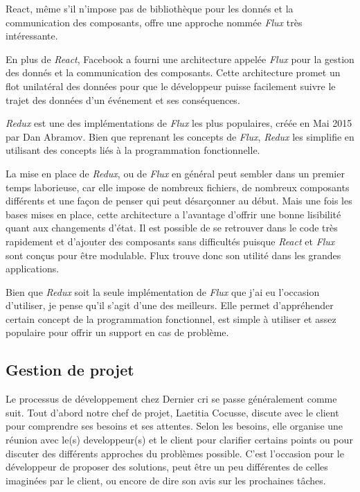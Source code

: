 React, même s'il n'impose pas de bibliothèque pour les donnés et la
communication des composants, offre une approche nommée \emph{Flux} très
intéressante.

\bigskip

En plus de \emph{React}, Facebook a fourni une architecture appelée
\emph{Flux} pour la gestion des donnés et la communication des
composants. Cette architecture promet un flot unilatéral des données
pour que le développeur puisse facilement suivre le trajet des données
d'un événement et ses conséquences.

\bigskip

\emph{Redux} est une des implémentations de \emph{Flux} les plus
populaires, créée en Mai 2015 par Dan Abramov. Bien que reprenant les
concepts de \emph{Flux}, \emph{Redux} les simplifie en utilisant des
concepts liés à la programmation fonctionnelle.

\bigskip

La mise en place de \emph{Redux}, ou de \emph{Flux} en général peut
sembler dans un premier temps laborieuse, car elle impose de nombreux
fichiers, de nombreux composants différents et une façon de penser qui
peut désarçonner au début. Mais une fois les bases mises en place, cette
architecture a l'avantage d'offrir une bonne lisibilité quant aux
changements d'état. Il est possible de se retrouver dans le code très
rapidement et d'ajouter des composants sans difficultés puisque
\emph{React} et \emph{Flux} sont conçus pour être modulable. Flux trouve
donc son utilité dans les grandes applications.

\bigskip

Bien que \emph{Redux} soit la seule implémentation de \emph{Flux} que
j'ai eu l'occasion d'utiliser, je pense qu'il s'agit d'une des
meilleurs. Elle permet d'appréhender certain concept de la programmation
fonctionnel, est simple à utiliser et assez populaire pour offrir un
support en cas de problème.

\bigskip

\subsection{Gestion de projet}\label{gestion-de-projet}

\bigskip

Le processus de développement chez Dernier cri se passe généralement
comme suit. Tout d'abord notre chef de projet, Laetitia Cocusse, discute
avec le client pour comprendre ses besoins et ses attentes. Selon les
besoins, elle organise une réunion avec le(s) developpeur(s) et le
client pour clarifier certains points ou pour discuter des différents
approches du problèmes possible. C'est l'occasion pour le développeur de
proposer des solutions, peut être un peu différentes de celles imaginées
par le client, ou encore de dire son avis sur les prochaines tâches.

